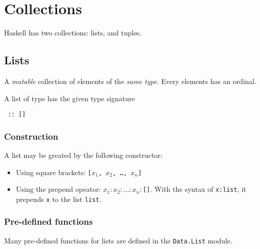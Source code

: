 \section{Collections}

Haskell has two collections: lists, and tuples.

\subsection{Lists}
A \textit{mutable} collection of elements of the \textit{same type}. Every elements has an ordinal.

A list of type \texttt{} has the given type signature
\begin{center}
  \texttt{ :: []}
\end{center}

\subsubsection{Construction}
A list may be greated by the following constructor:
\begin{itemize}
  \item Using square brackets: \texttt{[$x_1$, $x_2$, \ldots, $x_n$]}
  \item Using the prepend opeator: \texttt{$x_1:x_2:\ldots:x_n:$[]}. With the syntax of \texttt{x:list}, it prepends \texttt{x} to the list \texttt{list}.
\end{itemize}

\subsubsection{Pre-defined functions}
Many pre-defined functions for lists are defined in the \texttt{Data.List} module.

